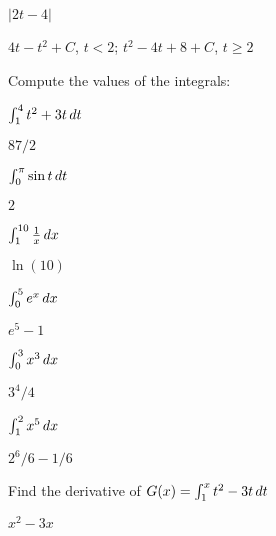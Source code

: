 \begin{mainTheorem}
\begin{exercises}
\begin{exercise} $|2t-4|$
\begin{answer} $4t-t^2+C$, $t<2$; $t^2-4t+8+C$, $t\ge 2$
\end{answer}\end{exercise}

\endtwocol

\noindent
Compute the values of the integrals:

\twocol

\begin{exercise} $\int_1^4 t^2+3t\, d t$
\begin{answer} $87/2$
\end{answer}\end{exercise}

\begin{exercise} $\int_0^\pi \sin t\, d t$
\begin{answer} $2$
\end{answer}\end{exercise}

\iflatetranscendentals
\else
\begin{exercise} $\int_1^{10} {1\over x}\, d x$
\begin{answer} $\ln(10)$
\end{answer}\end{exercise}

\begin{exercise} $\int_0^5 e^x\, d x$
\begin{answer} $e^5-1$
\end{answer}\end{exercise}
\fi

\begin{exercise} $\int_0^3 x^3\, d x$
\begin{answer} $3^4/4$
\end{answer}\end{exercise}

\begin{exercise} $\int_1^2 x^5\, d x$
\begin{answer} $2^6/6 -1/6$
\end{answer}\end{exercise}

\endtwocol

\msk
\begin{exercise} Find the derivative of $G(x)=\int_1^x t^2-3t\, d t$
\begin{answer} $x^2-3x$
\end{answer}\end{exercise}


\end{exercises}
\end{mainTheorem}
